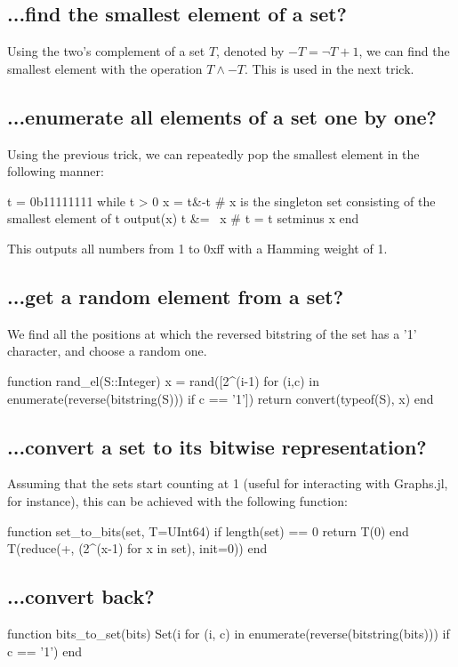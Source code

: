 \subsection*{...find the smallest element of a set?}
Using the two's complement of a set $T$, denoted by $-T = \lnot T+1$, we can find the smallest element with the operation $T\land -T$. This is used in the next trick.

\subsection*{...enumerate all elements of a set one by one?}
Using the previous trick, we can repeatedly pop the smallest element in the following manner:
\begin{jllisting}
  t = 0b11111111
  while t > 0
    x = t&-t  # x is the singleton set consisting of the smallest element of t
    output(x)
    t &= ~x   # t = t setminus x
  end
\end{jllisting}
This outputs all numbers from 1 to 0xff with a Hamming weight of 1.

\subsection*{...get a random element from a set?}
We find all the positions at which the reversed bitstring of the set has a '1' character, and choose a random one.

\begin{jllisting}
function rand_el(S::Integer)
  x = rand([2^(i-1) for (i,c) in enumerate(reverse(bitstring(S))) if c == '1'])
  return convert(typeof(S), x)
end
\end{jllisting}

\subsection*{...convert a set to its bitwise representation?}
Assuming that the sets start counting at 1 (useful for interacting with Graphs.jl, for instance), this can be achieved with the following function:

\begin{jllisting}
function set_to_bits(set, T=UInt64)
  if length(set) == 0 return T(0) end
  T(reduce(+, (2^(x-1) for x in set), init=0))
end
\end{jllisting}

\subsection*{...convert back?}
\begin{jllisting}
function bits_to_set(bits)
  Set(i for (i, c) in enumerate(reverse(bitstring(bits))) if c == '1')
end
\end{jllisting}